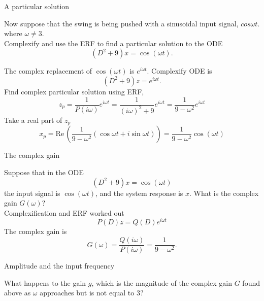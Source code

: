 \begin{exercise}
  A particular solution
\end{exercise}
Now suppose that the swing is being pushed with a sinusoidal input signal, $cos \omega t$.
where $\omega \neq 3$. \\
Complexify and use the ERF to find a particular solution to the ODE
\begin{equation*}
  (D^2+9)x = \cos (\omega t).
\end{equation*}

The complex replacement of $\cos (\omega t)$ is $e^{i \omega t}$.
Complexify ODE is
\begin{equation*}
  (D^2+9)z = e^{i \omega t}. 
\end{equation*}
Find complex particular solution using ERF,
\begin{equation*}
  z_ p = \frac{1}{P(i \omega)} e^{i \omega t} = \frac{1}{(i \omega)^2 + 9} e^{i \omega t}
  = \frac{1}{9 - \omega ^2} e^{i \omega t}
\end{equation*}
Take a real part of $z_ p$
\begin{equation*}
  x_ p = \mathrm{Re\, }\left( \frac{1}{9 - \omega ^2} (\cos \omega t + i \sin \omega t) \right)
  = \frac{1}{9 - \omega ^2} \cos (\omega t)
\end{equation*}

\begin{exercise}
  The complex gain
\end{exercise}
Suppose that in the ODE
\begin{equation*}
  (D^2+9)x = \cos (\omega t)
\end{equation*}
the input signal is $\cos ⁡(\omega t)$, and the system response is $x$.
What is the complex gain $G(\omega)$?\\

Complexification and ERF worked out
\begin{equation*}
  P(D)z = Q(D) e^{i \omega t} 
\end{equation*}
The complex gain is
\begin{equation*}
  G(\omega) = \frac{Q(i \omega)}{P(i \omega)} = \frac{1}{9 - \omega ^2}.
\end{equation*}

\begin{exercise}
  Amplitude and the input frequency
\end{exercise}
What happens to the gain $g$,
which is the magnitude of the complex gain $G$ found above as $\omega$
approaches but is not equal to $3$?\\

